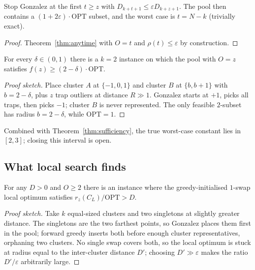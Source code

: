\documentclass[twoside,leqno,twocolumn]{article}
\newcommand{\OPT}{\mathrm{OPT}}
\newcommand{\rz}{r_z}
\newcommand{\CL}{C_L}
\begin{document}
\begin{corollary}
\label{cor:adaptive}
Stop Gonzalez at the first $t\ge z$ with $D_{k+t+1}\le\varepsilon
D_{k+z+1}$. The pool then contains a $(1+2\varepsilon)\cdot\OPT$
subset, and the worst case is $t=N-k$ (trivially exact).
\end{corollary}
\begin{proof}
Theorem~\ref{thm:anytime} with $O=t$ and $\rho(t)\le\varepsilon$ by
construction.
\end{proof}

\begin{theorem}
\label{thm:lowerbound2}
For every $\delta\in(0,1)$ there is a $k=2$ instance on which the pool
with $O=z$ satisfies $f(z)\ge(2-\delta)\cdot\OPT$.
\end{theorem}
\begin{proof}[Proof sketch]
Place cluster $A$ at $\{-1,0,1\}$ and cluster $B$ at $\{b,b+1\}$
with $b=2-\delta$, plus $z$ trap outliers at distance $R\gg 1$.
Gonzalez starts at $+1$, picks all traps, then picks $-1$; cluster
$B$ is never represented. The only feasible $2$-subset has radius
$b=2-\delta$, while $\OPT=1$.
\end{proof}

Combined with Theorem~\ref{thm:sufficiency}, the true worst-case
constant lies in $[2,3]$; closing this interval is open.

\subsection{What local search finds}
\label{sec:localstuff}

\begin{theorem}
\label{thm:neg}
For any $D>0$ and $O\ge2$ there is an instance where the
greedy-initialised $1$-swap local optimum satisfies
$\rz(\CL)/\OPT>D$.
\end{theorem}
\begin{proof}[Proof sketch]
Take $k$ equal-sized clusters and two singletons at slightly greater
distance. The singletons are the two farthest points, so Gonzalez
places them first in the pool; forward greedy inserts both before
enough cluster representatives, orphaning two clusters. No single swap
covers both, so the local optimum is stuck at radius equal to the
inter-cluster distance $D'$; choosing $D'\gg\varepsilon$ makes the
ratio $D'/\varepsilon$ arbitrarily large.
\end{proof}
\end{document}
